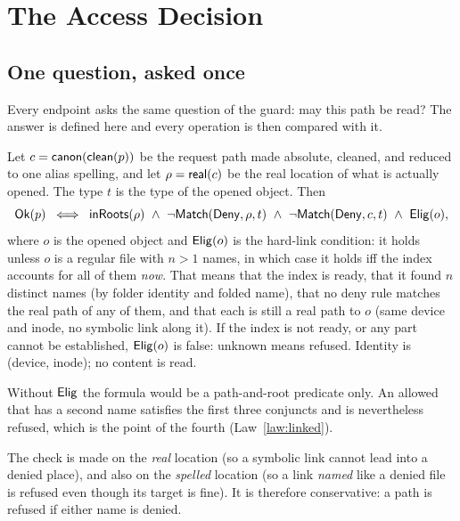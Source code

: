 \section{The Access Decision}
\label{sec:access}

\subsection{One question, asked once}

Every endpoint asks the same question of the guard: may this path be read?  The
answer is defined here and every operation is then compared with it.

\begin{definition}[Access]
\label{def:ok}
Let $c=\mathsf{canon}(\mathsf{clean}(p))$ be the request path made absolute, cleaned, and
reduced to one alias spelling, and let $\rho=\mathsf{real}(c)$ be the real location of
what is actually opened.  The type $t$ is the type of the opened object.  Then
\[
  \Ok(p)\;\iff\;
  \InRoots(\rho)\ \land\ \neg\Match(\Deny,\rho,t)\ \land\ \neg\Match(\Deny,c,t)
  \ \land\ \Elig(o),
\]
where $o$ is the opened object and $\mathsf{Elig}(o)$ is the hard-link condition: it holds
unless $o$ is a regular file with $n>1$ names, in which case it holds iff the
index accounts for all of them \emph{now}.  That means that the index is ready,
that it found $n$ distinct names (by folder identity and folded name), that no
deny rule matches the real path of any of them, and that each is still a real
path to $o$ (same device and inode, no symbolic link along it).  If the index is
not ready, or any part cannot be established, $\mathsf{Elig}(o)$ is false: unknown means
refused.  Identity is (device, inode); no content is read.
\end{definition}

Without $\mathsf{Elig}$ the formula would be a path-and-root predicate only.  An allowed
 that has a second name  satisfies the first three
conjuncts and is nevertheless refused, which is the point of the fourth
(Law~\ref{law:linked}).

The check is made on the \emph{real} location (so a symbolic link cannot lead
into a denied place), and also on the \emph{spelled} location (so a link
\emph{named} like a denied file is refused even though its target is fine).  It
is therefore conservative: a path is refused if either name is denied.

